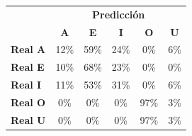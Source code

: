 \begin{tabular}{lccccc}
\toprule
 & \multicolumn{5}{c}{\textbf{Predicción}} \\
 & \textbf{A} & \textbf{E} & \textbf{I} & \textbf{O} & \textbf{U} \\
\midrule
\textbf{Real A} & \cellcolor[rgb]{0.92,0.92,1.00}  12\% & \cellcolor[rgb]{0.59,0.59,1.00} \color{white} 59\% & \cellcolor[rgb]{0.84,0.84,1.00}  24\% & \cellcolor[rgb]{1.00,1.00,1.00}  0\% & \cellcolor[rgb]{0.96,0.96,1.00}  6\% \\
\textbf{Real E} & \cellcolor[rgb]{0.93,0.93,1.00}  10\% & \cellcolor[rgb]{0.53,0.53,1.00} \color{white} 68\% & \cellcolor[rgb]{0.84,0.84,1.00}  23\% & \cellcolor[rgb]{1.00,1.00,1.00}  0\% & \cellcolor[rgb]{1.00,1.00,1.00}  0\% \\
\textbf{Real I} & \cellcolor[rgb]{0.92,0.92,1.00}  11\% & \cellcolor[rgb]{0.63,0.63,1.00} \color{white} 53\% & \cellcolor[rgb]{0.79,0.79,1.00}  31\% & \cellcolor[rgb]{1.00,1.00,1.00}  0\% & \cellcolor[rgb]{0.96,0.96,1.00}  6\% \\
\textbf{Real O} & \cellcolor[rgb]{1.00,1.00,1.00}  0\% & \cellcolor[rgb]{1.00,1.00,1.00}  0\% & \cellcolor[rgb]{1.00,1.00,1.00}  0\% & \cellcolor[rgb]{0.32,0.32,1.00} \color{white} 97\% & \cellcolor[rgb]{0.98,0.98,1.00}  3\% \\
\textbf{Real U} & \cellcolor[rgb]{1.00,1.00,1.00}  0\% & \cellcolor[rgb]{1.00,1.00,1.00}  0\% & \cellcolor[rgb]{1.00,1.00,1.00}  0\% & \cellcolor[rgb]{0.32,0.32,1.00} \color{white} 97\% & \cellcolor[rgb]{0.98,0.98,1.00}  3\% \\
\bottomrule
\end{tabular}